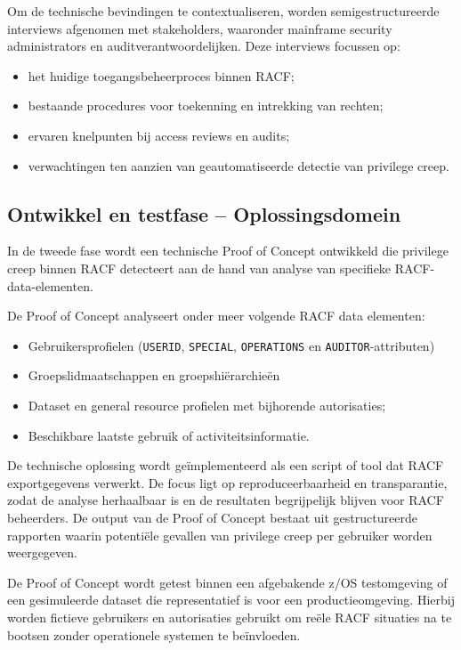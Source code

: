 Om de technische bevindingen te contextualiseren, worden semigestructureerde interviews afgenomen met stakeholders, waaronder mainframe security administrators en auditverantwoordelijken. Deze interviews focussen op:
\begin{itemize}
	\item het huidige toegangsbeheerproces binnen RACF;
	\item bestaande procedures voor toekenning en intrekking van rechten;
	\item ervaren knelpunten bij access reviews en audits;
	\item verwachtingen ten aanzien van geautomatiseerde detectie van privilege creep.
\end{itemize}

\subsection{Ontwikkel en testfase – Oplossingsdomein}

In de tweede fase wordt een technische Proof of Concept ontwikkeld die privilege creep binnen RACF detecteert aan de hand van analyse van specifieke RACF-data-elementen.

De Proof of Concept analyseert onder meer volgende RACF data elementen:
\begin{itemize}
	\item Gebruikersprofielen (\texttt{USERID}, \texttt{SPECIAL}, \texttt{OPERATIONS} en \texttt{AUDITOR}-attributen)
	\item Groepslidmaatschappen en groepshiërarchieën
	\item Dataset en general resource profielen met bijhorende autorisaties;
	\item Beschikbare laatste gebruik of activiteitsinformatie.
\end{itemize}
De technische oplossing wordt geïmplementeerd als een script of tool dat RACF exportgegevens verwerkt. De focus ligt op reproduceerbaarheid en transparantie, zodat de analyse herhaalbaar is en de resultaten begrijpelijk blijven voor RACF beheerders. De output van de Proof of Concept bestaat uit gestructureerde rapporten waarin potentiële gevallen van privilege creep per gebruiker worden weergegeven.

De Proof of Concept wordt getest binnen een afgebakende z/OS testomgeving of een gesimuleerde dataset die representatief is voor een productieomgeving. Hierbij worden fictieve gebruikers en autorisaties gebruikt om reële RACF situaties na te bootsen zonder operationele systemen te beïnvloeden.

